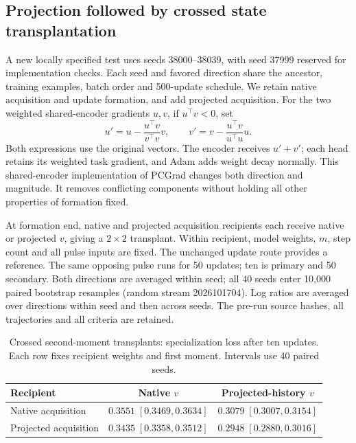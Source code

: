 \subsection{Projection followed by crossed state transplantation}
\label{app:projection}
A new locally specified test uses seeds 38000--38039, with seed 37999 reserved for implementation checks. Each seed and favored direction share the ancestor, training examples, batch order and 500-update schedule. We retain native acquisition and update formation, and add projected acquisition. For the two weighted shared-encoder gradients $u,v$, if $u^\top v<0$, set
\begin{equation}u'=u-\frac{u^\top v}{v^\top v}v,\qquad v'=v-\frac{u^\top v}{u^\top u}u.\end{equation}
Both expressions use the original vectors. The encoder receives $u'+v'$; each head retains its weighted task gradient, and Adam adds weight decay normally. This shared-encoder implementation of PCGrad changes both direction and magnitude. It removes conflicting components without holding all other properties of formation fixed.

At formation end, native and projected acquisition recipients each receive native or projected $v$, giving a $2\times2$ transplant. Within recipient, model weights, $m$, step count and all pulse inputs are fixed. The unchanged update route provides a reference. The same opposing pulse runs for 50 updates; ten is primary and 50 secondary. Both directions are averaged within seed; all 40 seeds enter 10,000 paired bootstrap resamples (random stream 2026101704). Log ratios are averaged over directions within seed and then across seeds. The pre-run source hashes, all trajectories and all criteria are retained.

\begin{table}[ht]\centering\small
\caption{Crossed second-moment transplants: specialization loss after ten updates. Each row fixes recipient weights and first moment. Intervals use 40 paired seeds.}
\label{tab:projection}
\begin{tabular}{lcc}\toprule
Recipient & Native $v$ & Projected-history $v$\\
\midrule
Native acquisition & $0.3551\;[0.3469,0.3634]$ & $0.3079\;[0.3007,0.3154]$\\
Projected acquisition & $0.3435\;[0.3358,0.3512]$ & $0.2948\;[0.2880,0.3016]$\\
\bottomrule\end{tabular}\end{table}

